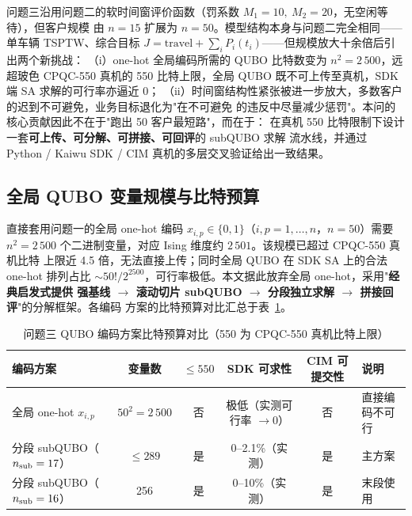 \documentclass[UTF8,12pt,a4paper]{ctexart}
\begin{document}
问题三沿用问题二的软时间窗评价函数（罚系数 $M_1=10,\ M_2=20$，无空闲等待），但客户规模
由 $n=15$ 扩展为 $n=50$。模型结构本身与问题二完全相同——单车辆 TSPTW、综合目标
$J=\mathrm{travel}+\sum_i P_i(t_i)$——但规模放大十余倍后引出两个新挑战：
（i）one-hot 全局编码所需的 QUBO 比特数变为 $n^{2}=2\,500$，远超玻色 CPQC-550 真机的
550 比特上限，全局 QUBO 既不可上传至真机，SDK 端 SA 求解的可行率亦逼近 0；
（ii）时间窗结构性紧张被进一步放大，多数客户的迟到不可避免，业务目标退化为"在不可避免
的违反中尽量减少惩罚"。本问的核心贡献因此不在于"跑出 50 客户最短路"，而在于：
在真机 550 比特限制下设计一套\textbf{可上传、可分解、可拼接、可回评}的 subQUBO 求解
流水线，并通过 Python / Kaiwu SDK / CIM 真机的多层交叉验证给出一致结果。

\subsection{全局 QUBO 变量规模与比特预算}
\label{subsec:q3-budget}

直接套用问题一的全局 one-hot 编码 $x_{i,p}\in\{0,1\}$（$i,p=1,\dots,n$，$n=50$）需要
$n^{2}=2\,500$ 个二进制变量，对应 Ising 维度约 $2\,501$。该规模已超过 CPQC-550 真机比特
上限近 4.5 倍，无法直接上传；同时全局 QUBO 在 SDK SA 上的合法 one-hot 排列占比
$\sim 50!/2^{2500}$，可行率极低。本文据此放弃全局 one-hot，采用"\textbf{经典启发式提供
强基线 $\to$ 滚动切片 subQUBO $\to$ 分段独立求解 $\to$ 拼接回评}"的分解框架。各编码
方案的比特预算对比汇总于表~\ref{tab:q3-budget}。

\begin{table}[H]
  \centering
  \caption{问题三 QUBO 编码方案比特预算对比（550 为 CPQC-550 真机比特上限）}
  \label{tab:q3-budget}
  \footnotesize
  \begin{tabular}{lccccl}
    \toprule
    编码方案 & 变量数 & $\le 550$ & SDK 可求性 & CIM 可提交性 & 说明 \\
    \midrule
    全局 one-hot $x_{i,p}$              & $50^{2}=2\,500$ & 否 & 极低（实测可行率 $\to 0$） & 否    & 直接编码不可行 \\
    分段 subQUBO（$n_{\rm sub}=17$）     & $\le 289$       & 是 & 0--2.1\%（实测）           & 是    & 主方案 \\
    分段 subQUBO（$n_{\rm sub}=16$）     & 256             & 是 & 0--10\%（实测）            & 是    & 末段使用 \\
    \bottomrule
  \end{tabular}
\end{table}
\end{document}
